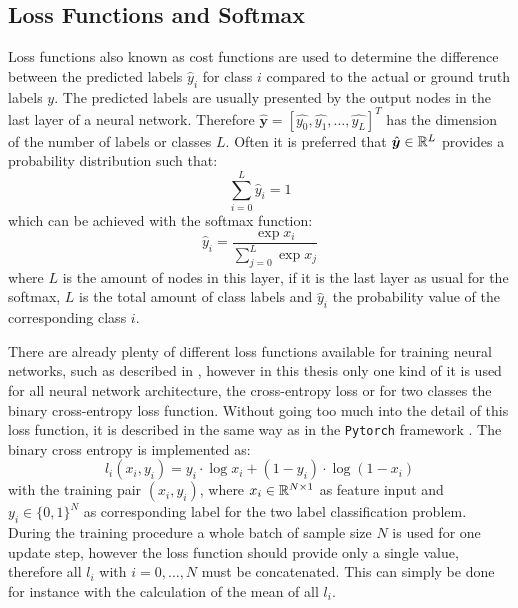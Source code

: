 
\subsection{Loss Functions and Softmax}
Loss functions also known as cost functions are used to determine the difference between the predicted labels $\hat{y}_i$ for class $i$ compared to the actual or ground truth labels $y$.
The predicted labels are usually presented by the output nodes in the last layer of a neural network.
Therefore $\hat{\bm{y}} = [\hat{y_0}, \hat{y_1}, \dots, \hat{y_L}]^T$ has the dimension of the number of labels or classes $L$.
Often it is preferred that $\hat{\bm{y}} \in \mathbb{R}^L$ provides a probability distribution such that:
\begin{equation}
  \sum_{i=0}^L \hat{y}_i = 1
\end{equation}
which can be achieved with the softmax function:
\begin{equation}\label{eq:nn_theory_softmax}
  \hat{y}_i = \frac{\exp{x_i}}{\sum_{j=0}^{L}\exp{x_j}}
\end{equation}
where $L$ is the amount of nodes in this layer, if it is the last layer as usual for the softmax, $L$ is the total amount of class labels and $\hat{y}_i$ the probability value of the corresponding class $i$.

There are already plenty of different loss functions available for training neural networks, such as described in \cite{LeCun2006}, however in this thesis only one kind of it is used for all neural network architecture, the cross-entropy loss or for two classes the binary cross-entropy loss function.
Without going too much into the detail of this loss function, it is described in the same way as in the \texttt{Pytorch} framework \cite{Pytorch}.
The binary cross entropy is implemented as:
\begin{equation}
  l_i(x_i, y_i) = y_i \cdot \log x_i + (1 - y_i) \cdot \log (1 - x_i)
\end{equation}
with the training pair $(x_i, y_i)$, where $x_i \in \mathbb{R}^{N \times 1}$ as feature input and $y_i \in \{0, 1\}^N$ as corresponding label for the two label classification problem.
During the training procedure a whole batch of sample size $N$ is used for one update step, however the loss function should provide only a single value, therefore all $l_i$ with $i = 0, \dots, N$ must be concatenated.
This can simply be done for instance with the calculation of the mean of all $l_i$.

